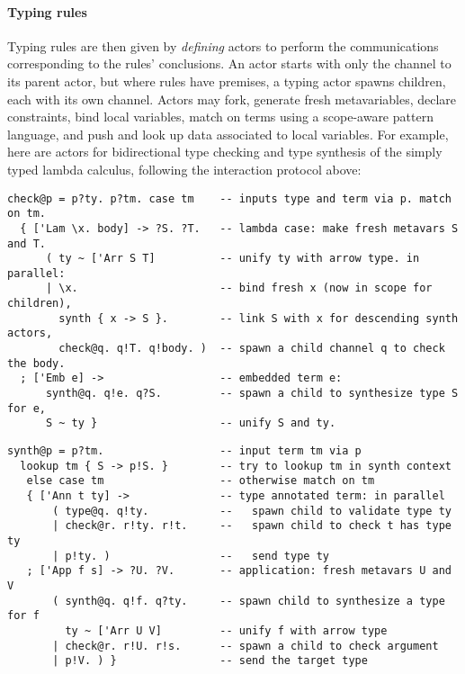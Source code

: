\documentclass{easychair}
\newcommand{\tm}[1]{\texttt{#1}\;}
\newcommand{\x}{\tm{x}}
\begin{document}
\paragraph{Typing rules}
Typing rules are then given by \emph{defining} actors to
perform the communications corresponding to the rules' conclusions. An
actor starts with only the channel to its parent actor, but where
rules have premises, a typing actor spawns children, each with its own
channel.  %
Actors may fork, generate fresh metavariables, declare constraints, bind
local variables, match on terms using a
scope-aware pattern language, and push and look up data associated to
local variables.
%
For example, here are actors for bidirectional type checking and type synthesis of the simply typed lambda calculus, following the interaction protocol above:
%
\begin{lstlisting}[columns=fullflexible,keepspaces=true]
check@p = p?ty. p?tm. case tm    -- inputs type and term via p. match on tm.
  { ['Lam \x. body] -> ?S. ?T.   -- lambda case: make fresh metavars S and T.
      ( ty ~ ['Arr S T]          -- unify ty with arrow type. in parallel:
      | \x.                      -- bind fresh x (now in scope for children),
        synth { x -> S }.        -- link S with x for descending synth actors,
        check@q. q!T. q!body. )  -- spawn a child channel q to check the body.
  ; ['Emb e] ->                  -- embedded term e:
      synth@q. q!e. q?S.         -- spawn a child to synthesize type S for e,
      S ~ ty }                   -- unify S and ty.
\end{lstlisting}
%
\begin{lstlisting}[columns=fullflexible,keepspaces=true]
synth@p = p?tm.                  -- input term tm via p
  lookup tm { S -> p!S. }        -- try to lookup tm in synth context
   else case tm                  -- otherwise match on tm
   { ['Ann t ty] ->              -- type annotated term: in parallel
       ( type@q. q!ty.           --   spawn child to validate type ty
       | check@r. r!ty. r!t.     --   spawn child to check t has type ty
       | p!ty. )                 --   send type ty
   ; ['App f s] -> ?U. ?V.       -- application: fresh metavars U and V
       ( synth@q. q!f. q?ty.     -- spawn child to synthesize a type for f
         ty ~ ['Arr U V]         -- unify f with arrow type
       | check@r. r!U. r!s.      -- spawn a child to check argument
       | p!V. ) }                -- send the target type
\end{lstlisting}
\end{document}
